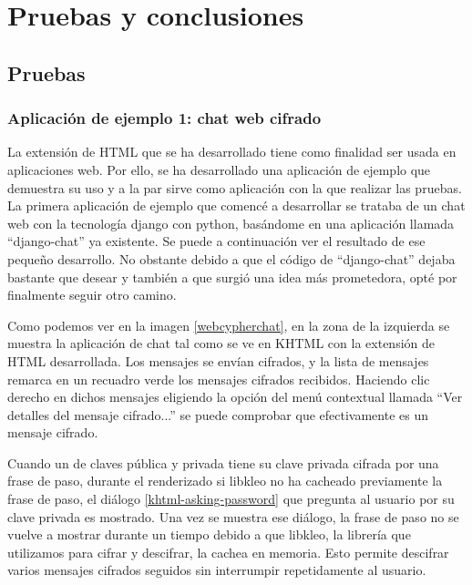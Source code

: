 \chapter{Pruebas y conclusiones}\label{pruebas_y_conclusiones}

\section{Pruebas}
\subsection{Aplicación de ejemplo 1: chat web cifrado}

La extensión de HTML que se ha desarrollado tiene como finalidad ser usada en aplicaciones web. Por ello, se ha desarrollado una aplicación de ejemplo que demuestra su uso y a la par sirve como aplicación con la que realizar las pruebas. La primera aplicación de ejemplo que comencé a desarrollar se trataba de un chat web con la tecnología django con python, basándome en una aplicación llamada ``django-chat'' ya existente. Se puede a continuación ver el resultado de ese pequeño desarrollo. No obstante debido a que el código de ``django-chat'' dejaba bastante que desear y también a que surgió una idea más prometedora, opté por finalmente seguir otro camino.


Como podemos ver en la imagen \ref{webcypherchat}, en la zona de la izquierda se muestra la aplicación de chat tal como se ve en KHTML con la extensión de HTML desarrollada. Los mensajes se envían cifrados, y la lista de mensajes remarca en un recuadro verde los mensajes cifrados recibidos. Haciendo clic derecho en dichos mensajes eligiendo la opción del menú contextual llamada ``Ver detalles del mensaje cifrado...'' se puede comprobar que efectivamente es un mensaje cifrado.


Cuando un de claves pública y privada tiene su clave privada cifrada por una frase de paso, durante el renderizado si libkleo no ha cacheado previamente la frase de paso, el diálogo \ref{khtml-asking-password} que pregunta al usuario por su clave privada es mostrado. Una vez se muestra ese diálogo, la frase de paso no se vuelve a mostrar durante un tiempo debido a que libkleo, la librería que utilizamos para cifrar y descifrar, la cachea en memoria. Esto permite descifrar varios mensajes cifrados seguidos sin interrumpir repetidamente al usuario.

